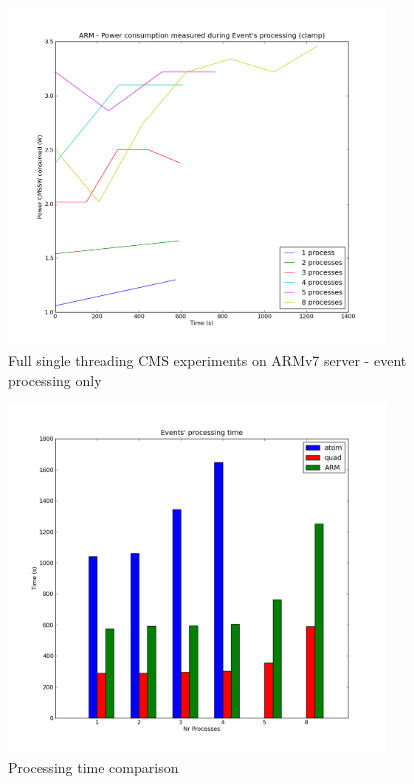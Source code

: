 \begin{figure}[h!]
  \centering
    \includegraphics[width=100mm]{"img/aalto/aalto_armEvents"}
    \caption{Full single threading CMS experiments on ARMv7 server - event
processing only}
    \label{fig:aalto_arm_events}
\end{figure}


\begin{figure}[h!]
  \centering
    \includegraphics[width=100mm]{"img/aalto/aalto_all_time"}
    \caption{Processing time comparison}
    \label{fig:aalto_time}
\end{figure}


